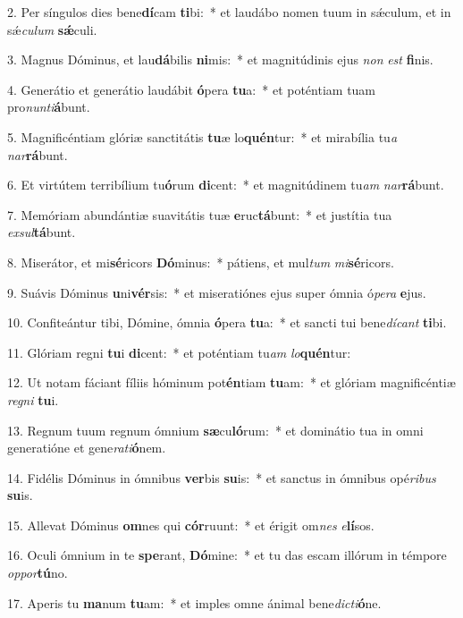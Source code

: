 2. Per síngulos dies bene\textbf{dí}cam \textbf{ti}bi:~*  et laudábo nomen tuum in sǽculum, et in sǽ\textit{cu}\textit{lum} \textbf{sǽ}culi.\

3. Magnus Dóminus, et lau\textbf{dá}bilis \textbf{ni}mis:~*  et magnitúdinis ejus \textit{non} \textit{est} \textbf{fi}nis.\

4. Generátio et generátio laudábit \textbf{ó}pera \textbf{tu}a:~*  et poténtiam tuam pro\textit{nun}\textit{ti}\textbf{á}bunt.\

5. Magnificéntiam glóriæ sanctitátis \textbf{tu}æ lo\textbf{quén}tur:~*  et mirabília tu\textit{a} \textit{nar}\textbf{rá}bunt.\

6. Et virtútem terribílium tu\textbf{ó}rum \textbf{di}cent:~*  et magnitúdinem tu\textit{am} \textit{nar}\textbf{rá}bunt.\

7. Memóriam abundántiæ suavitátis tuæ \textbf{e}ruc\textbf{tá}bunt:~*  et justítia tua \textit{ex}\textit{sul}\textbf{tá}bunt.\

8. Miserátor, et mi\textbf{sé}ricors \textbf{Dó}minus:~*  pátiens, et mul\textit{tum} \textit{mi}\textbf{sé}ricors.\

9. Suávis Dóminus \textbf{u}ni\textbf{vér}sis:~*  et miseratiónes ejus super ómnia ó\textit{pe}\textit{ra} \textbf{e}jus.\

10. Confiteántur tibi, Dómine, ómnia \textbf{ó}pera \textbf{tu}a:~*  et sancti tui bene\textit{dí}\textit{cant} \textbf{ti}bi.\

11. Glóriam regni \textbf{tu}i \textbf{di}cent:~*  et poténtiam tu\textit{am} \textit{lo}\textbf{quén}tur:\

12. Ut notam fáciant fíliis hóminum pot\textbf{én}tiam \textbf{tu}am:~*  et glóriam magnificéntiæ \textit{re}\textit{gni} \textbf{tu}i.\

13. Regnum tuum regnum ómnium \textbf{sæ}cu\textbf{ló}rum:~*  et dominátio tua in omni generatióne et gene\textit{ra}\textit{ti}\textbf{ó}nem.\

14. Fidélis Dóminus in ómnibus \textbf{ver}bis \textbf{su}is:~*  et sanctus in ómnibus opé\textit{ri}\textit{bus} \textbf{su}is.\

15. Allevat Dóminus \textbf{om}nes qui \textbf{cór}ruunt:~*  et érigit om\textit{nes} \textit{e}\textbf{lí}sos.\

16. Oculi ómnium in te \textbf{spe}rant, \textbf{Dó}mine:~*  et tu das escam illórum in témpore \textit{op}\textit{por}\textbf{tú}no.\

17. Aperis tu \textbf{ma}num \textbf{tu}am:~*  et imples omne ánimal bene\textit{dic}\textit{ti}\textbf{ó}ne.\

